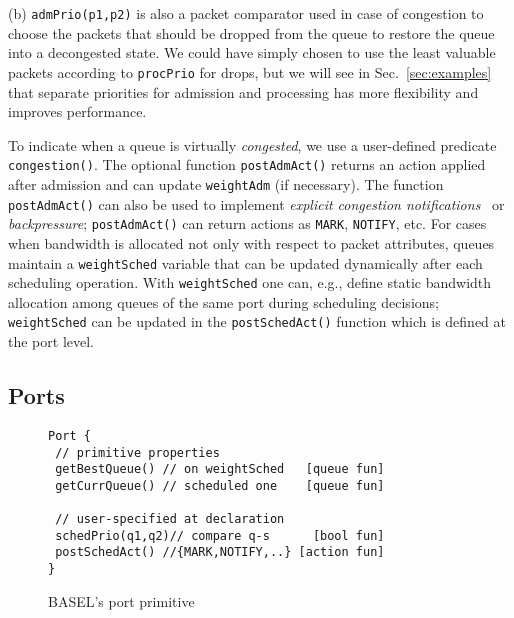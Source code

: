 \documentclass{article}
\newcommand{\barch}{BASEL}
\begin{document}
(b)
\lstinline|admPrio(p1,p2)| is also a packet comparator used in case of congestion to
choose the packets that should be dropped from the queue to restore the queue into a decongested state.
We could have simply chosen to use the least valuable packets according to \lstinline|procPrio| for drops,
but we will see in Sec.~\ref{sec:examples} that separate priorities for admission and processing 
has more flexibility and improves performance. 

To indicate when a queue is virtually \emph{congested}, we use a user-defined predicate \lstinline|congestion()|. 
The optional function \lstinline|postAdmAct()| returns an action applied after admission and
can update \lstinline|weightAdm| (if necessary). The function \lstinline|postAdmAct()| can also be used to implement \emph{explicit congestion notifications}~\cite{BauerBB11} or \emph{backpressure}; \lstinline|postAdmAct()| can return actions as \lstinline|MARK|, \lstinline|NOTIFY|, etc. For cases when bandwidth is allocated not only with 
respect to packet attributes, queues maintain a \lstinline|weightSched| variable that can be updated dynamically
after each scheduling operation. With \lstinline|weightSched| one can, e.g., define static
bandwidth allocation among queues of the same port during scheduling decisions; \lstinline|weightSched| can be 
updated in the \lstinline|postSchedAct()|  function which is defined at the port level.





\subsection{Ports}

\begin{figure}[t]
	\centering
  \begin{minipage}{.938\linewidth}
\begin{lstlisting}[frame=tb,basicstyle=\ttfamily\small,belowskip=0em]
Port {
 // primitive properties
 getBestQueue() // on weightSched   [queue fun]
 getCurrQueue() // scheduled one    [queue fun]

 // user-specified at declaration
 schedPrio(q1,q2)// compare q-s      [bool fun]
 postSchedAct() //{MARK,NOTIFY,..} [action fun]
}
\end{lstlisting}
      \caption{\barch{}'s port primitive}\label{list:ports}
  \end{minipage}
\end{figure}
\end{document}
